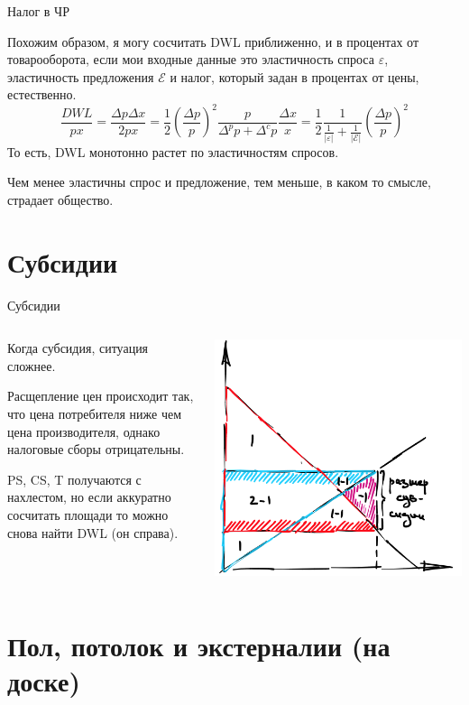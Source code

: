 \documentclass{beamer}
\begin{document}
\begin{frame}{Налог в ЧР}

Похожим образом, я могу сосчитать DWL приближенно, и \alert{в процентах от товарооборота}, если мои входные данные это эластичность спроса $\varepsilon$, эластичность предложения $\mathcal{E}$ и налог, который задан в процентах от цены, естественно.
$$ \frac{DWL}{px} = \frac{\Delta p \Delta x}{2 p x} = \frac{1}{2}(\frac{\Delta p}{p})^2  \frac{p}{\Delta^p p + \Delta^c p} \frac{\Delta x}{x} = \frac{1}{2}\frac{1}{\frac{1}{|\varepsilon|} + \frac{1}{|\mathcal{E}|}} (\frac{\Delta p}{p})^2$$
То есть, DWL монотонно растет по эластичностям спросов. 

Чем менее эластичны спрос и предложение, тем меньше, в каком то смысле, страдает общество.

\end{frame}

\section{Субсидии}

\begin{frame}{Субсидии}
\begin{columns}
\begin{column}{0.4\textwidth}
   Когда субсидия, ситуация сложнее.
   
   \medskip
   \alert{Расщепление цен происходит так, что цена потребителя ниже чем цена производителя, однако налоговые сборы отрицательны}.
   
   \medskip
   PS, CS, T получаются с нахлестом, но если аккуратно сосчитать площади то можно снова найти DWL (он справа).
\end{column}
\begin{column}{0.6\textwidth}  %
    \begin{center}
     \includegraphics[width=1\textwidth]{subsidy}
     \end{center}
\end{column}
\end{columns}
\end{frame}

\section{Пол, потолок и экстерналии (на доске)}
\end{document}
